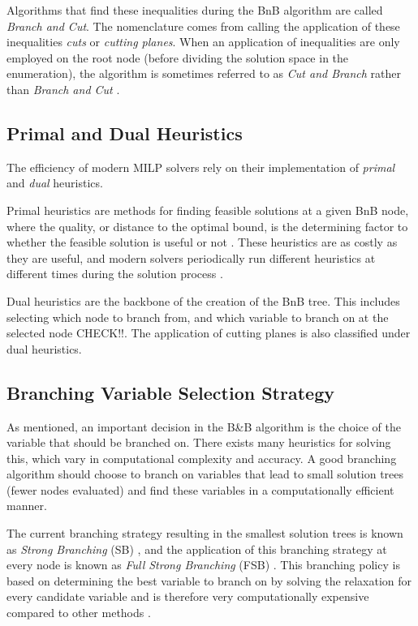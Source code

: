 Algorithms that find these inequalities during the \gls{BnB} algorithm are called \textit{Branch and Cut}. The nomenclature comes from calling the application of these inequalities \textit{cuts} or \textit{cutting planes}.
When an application of inequalities are only employed on the root node (before dividing the solution space in the enumeration), the algorithm is sometimes referred to as \textit{Cut and Branch} rather than \textit{Branch and Cut} \cite{wolsey2020integer}.

\subsection{Primal and Dual Heuristics}

The efficiency of modern \gls{MILP} solvers rely on their implementation of \textit{primal} and \textit{dual} heuristics.

Primal heuristics are methods for finding feasible solutions at a given \gls{BnB} node, where the quality, or distance to the optimal bound, is the determining factor to whether the feasible solution is useful or not \cite{khalil2020towards}. These heuristics are as costly as they are useful, and modern solvers periodically run different heuristics at different times during the solution process \cite{khalil2020towards}.  

Dual heuristics are the backbone of the creation of the \gls{BnB} tree. This includes selecting which node to branch from, and which variable to branch on at the selected node CHECK!!. The application of cutting planes is also classified under dual heuristics.


\subsection{Branching Variable Selection Strategy}\label{ssec:branchingstrategy}

As mentioned, an important decision in the B\&B algorithm is the choice of the variable that should be branched on. 
There exists many heuristics for solving this, which vary in computational complexity and accuracy. 
A good branching algorithm should choose to branch on variables that lead to small solution trees (fewer nodes evaluated) and find these variables in a computationally efficient manner. 

The current branching strategy resulting in the smallest solution trees is known as \textit{Strong Branching} (\gls{SB}) \cite{applegate1995finding}, and the application of this branching strategy at every node is known as \textit{Full Strong Branching} (\gls{FSB}) \cite{achterberg2004branching}. 
This branching policy is based on determining the best variable to branch on by solving the relaxation for every candidate variable and is therefore very computationally expensive compared to other methods \cite{achterberg2004branching}.

